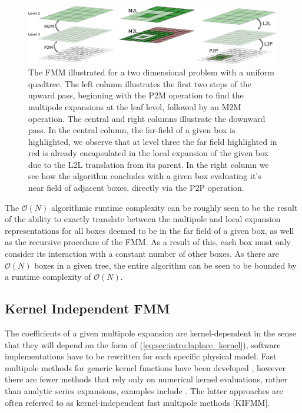 \documentclass{IEEEcsmag}
\begin{document}
\begin{figure}
\centerline{\includegraphics {figures/algorithm.pdf}}
\caption{The FMM illustrated for a two dimensional problem with a uniform quadtree. The left column illustrates the first two steps of the upward pass, beginning with the P2M operation to find the multipole expansions at the leaf level, followed by an M2M operation. The central and right columns illustrate the downward pass. In the central column, the far-field of a given box is highlighted, we observe that at level three the far field highlighted in red is already encapsulated in the local expansion of the given box due to the L2L translation from its parent. In the right column we see how the algorithm concludes with a given box evaluating it's near field of adjacent boxes, directly via the P2P operation.}
\label{fig:tree_traversal}
\end{figure}

The $\mathcal{O}(N)$ algorithmic runtime complexity can be roughly seen to be the result of the ability to exactly translate between the multipole and local expansion representations for all boxes deemed to be in the far field of a given box, as well as the recursive procedure of the FMM. As a result of this, each box must only consider its interaction with a constant number of other boxes. As there are $\mathcal{O}(N)$ boxes in a given tree, the entire algorithm can be seen to be bounded by a runtime complexity of $\mathcal{O}(N)$.

\subsection{Kernel Independent FMM}

The coefficients of a given multipole expansion are kernel-dependent in the sense that they will depend on the form of (\ref{eq:sec:intro:laplace_kernel}), software implementations have to be rewritten for each specific physical model. Fast multipole methods for generic kernel functions have been developed \cite{Gimbutas2003}, however there are fewer methods that rely only on numerical kernel evaluations, rather than analytic series expansions, examples include \cite{Fong2009, Ying2004}. The latter approaches are often referred to as kernel-independent fast multipole methods [KIFMM].
\end{document}
